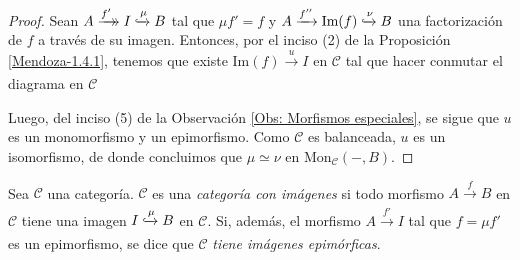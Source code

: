 \documentclass[tesis]{subfiles}
\begin{document}
\begin{proof}

    Sean $A\xrightarrow[]{f'}\mathrel{\mkern-14mu}\rightarrow I\xhookrightarrow{\mu}B$ tal que $\mu f'=f$ y $A\xrightarrow[]{f''} \text{Im}(f)\xhookrightarrow{\nu} B$ una factorización de $f$ a través de su imagen. Entonces, por el inciso (2) de la Proposición \ref{Mendoza-1.4.1}, tenemos que existe $\text{Im}(f)\xrightarrow[]{u} I$ en $\mathscr{C}$ tal que hacer conmutar el diagrama en $\mathscr{C}$
    \begin{center}
    \end{center}
    Luego, del inciso (5) de la Observación \ref{Obs: Morfismos especiales}, se sigue que $u$ es un monomorfismo y un epimorfismo. Como $\mathscr{C}$ es balanceada, $u$ es un isomorfismo, de donde concluimos que $\mu\simeq\nu$ en $\text{Mon}_\mathscr{C}(-,B)$.
\end{proof}

\begin{Def}\label{Def: Categoría con imágenes}
    Sea $\mathscr{C}$ una categoría. $\mathscr{C}$ es una \emph{categoría con imágenes} si todo morfismo $A\xrightarrow[]{f} B$ en $\mathscr{C}$ tiene una imagen $I\xhookrightarrow{\mu}B$ en $\mathscr{C}$. Si, además, el morfismo $A\xrightarrow[]{f'}I$ tal que $f=\mu f'$ es un epimorfismo, se dice que $\mathscr{C}$ \emph{tiene imágenes epimórficas}.
\end{Def}
\end{document}
